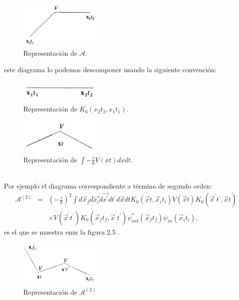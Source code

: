 \begin{figure}
\caption[Diagrama de Feynmann primera cuantización]{Representación de $\mathcal{A}$.}
\includegraphics[width=4cm]{Imagenes/Fig2}
\end{figure}
este diagrama lo podemos descomponer usando la siguiente convención:
\begin{figure}
\caption[Diagrama de Feynmann primera cuantización]{Representación de $K_0(x_2t_2,x_1t_1)$.}
\includegraphics[width=4cm]{Imagenes/Fig3}
\end{figure}
\begin{figure}
\caption[Diagrama de Feynmann primera cuantización]{Representación de $\int -\frac{i}{\hbar}V(xt)dxdt$.}
\includegraphics[width=4cm]{Imagenes/Fig4}
\end{figure}
\\
Por ejemplo el diagrama correspondiente a término de segundo orden:
\begin{eqnarray}
\nonumber \mathcal{A}^{(2)}&=&\left(-\frac{i}{\hbar}\right)^2\int d\vec{x}_{f}d\vec{x_{i}}d\vec{x^{\prime}}dt^{\prime} d\vec{x}dtK_{0}(\vec{x}t,\vec{x}_it_i)V(\vec{x}t)K_{0}(\vec{x}^{\prime} t^{\prime},\vec{x}t)\\
&&\times V(\vec{x}^{\prime} t^{\prime})K_{0}(\vec{x}_{f}t_{f},\vec{x}^{\prime} t^{\prime})\psi_{out}^{*}(\vec{x}_{f}t_{f})\psi_{in}(\vec{x}_{i}t_{i}),
\end{eqnarray}
es el que se muestra enm la figura 2.5 .
\begin{figure}
\caption[Diagrama de Feynmann primera cuantización]{Representación de $\mathcal{A}^{(2)}$}
\includegraphics[width=4cm]{Imagenes/Fig5}
\end{figure}
